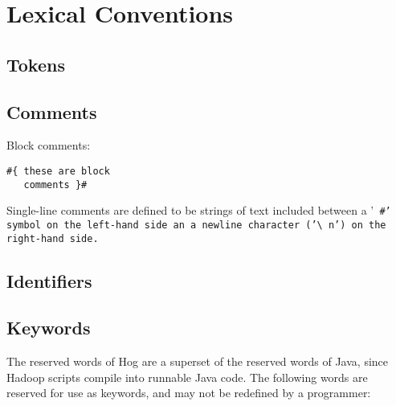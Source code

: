 \documentclass{book}
\begin{document}


\chapter{Lexical Conventions} %
\label{cha:lexical_conventions}

\section{Tokens} %
\label{sec:tokens}


\section{Comments} %
\label{sec:comments}

Block comments: 

\begin{verbatim}
#{ these are block
   comments }#
\end{verbatim}

Single-line comments are defined to be strings of text included between a '\tt
\#\rm' symbol on the left-hand side an a newline character ('\tt\textbackslash
n\rm') on the right-hand side.


\section{Identifiers} %
\label{sec:identifiers}


\section{Keywords} %
\label{sec:keywords}

The reserved words of Hog are a superset of the reserved words of Java, since
Hadoop scripts compile into runnable Java code. The following words are reserved
for use as keywords, and may not be redefined by a programmer:
\end{document}
